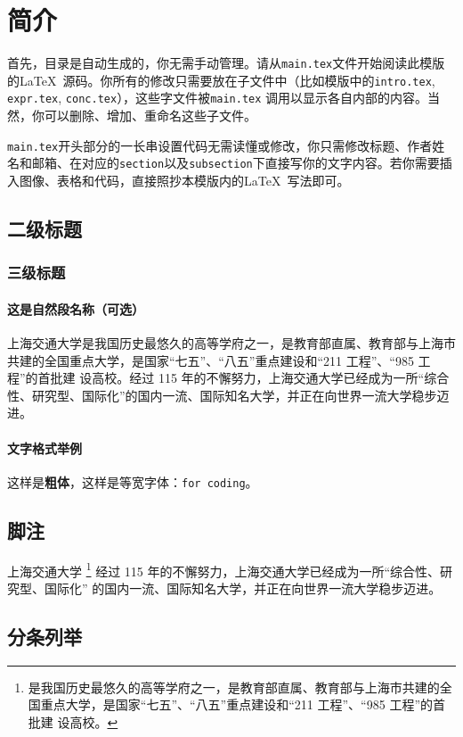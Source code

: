 \section{简介}
首先，目录是自动生成的，你无需手动管理。请从\texttt{main.tex}文件开始阅读此模版的\LaTeX\ 源码。你所有的修改只需要放在子文件中（比如模版中的\texttt{intro.tex}, \texttt{expr.tex}, \texttt{conc.tex}），这些字文件被\texttt{main.tex} 调用以显示各自内部的内容。当然，你可以删除、增加、重命名这些子文件。

\texttt{main.tex}开头部分的一长串设置代码无需读懂或修改，你只需修改标题、作者姓名和邮箱、在对应的\texttt{section}以及\texttt{subsection}下直接写你的文字内容。若你需要插入图像、表格和代码，直接照抄本模版内的\LaTeX\ 写法即可。

\subsection{二级标题}

\subsubsection{三级标题}
\paragraph{这是自然段名称（可选）}
上海交通大学是我国历史最悠久的高等学府之一，是教育部直属、教育部与上海市共建的全国重点大学，是国家“七五”、“八五”重点建设和“211 工程”、“985 工程”的首批建
设高校。经过 115 年的不懈努力，上海交通大学已经成为一所“综合性、研究型、国际化”的国内一流、国际知名大学，并正在向世界一流大学稳步迈进。 

\paragraph{文字格式举例}
这样是\textbf{粗体}，这样是等宽字体：\texttt{for coding}。

\subsection{脚注}
上海交通大学
\footnote{是我国历史最悠久的高等学府之一，是教育部直属、教育部与上海市共建的全国重点大学，是国家“七五”、“八五”重点建设和“211 工程”、“985 工程”的首批建
设高校。}
经过 115 年的不懈努力，上海交通大学已经成为一所“综合性、研究型、国际化”
的国内一流、国际知名大学，并正在向世界一流大学稳步迈进。 

\subsection{分条列举}

